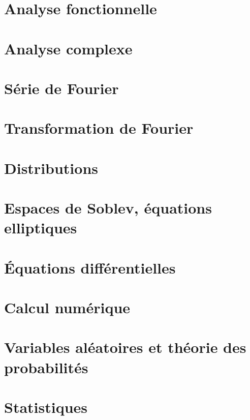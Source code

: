 \chapter{Analyse fonctionnelle}



\chapter{Analyse complexe}          \label{ChapICHIooXbLccl}



\chapter{Série de Fourier}


\chapter{Transformation de Fourier}


\chapter{Distributions}


\chapter{Espaces de Soblev, équations elliptiques}


\chapter{Équations différentielles}




\chapter{Calcul numérique}




\chapter{Variables aléatoires et théorie des probabilités}




\chapter{Statistiques}


